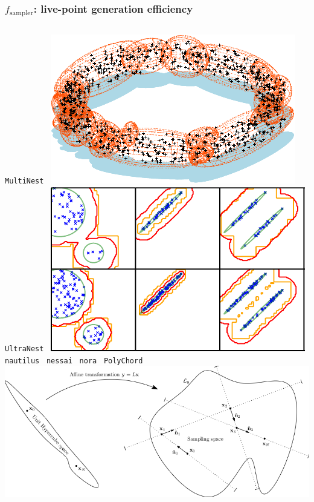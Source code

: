 \documentclass[aspectratio=169]{beamer}
\begin{document}
\begin{frame}
    \frametitle{$f_\text{sampler}$: live-point generation efficiency}
    \begin{columns}[t]
        \texttt{MultiNest}~
        \includegraphics[width=\textwidth]{figures/multinest}
        \texttt{UltraNest}~
        \includegraphics[width=\textwidth]{figures/radfriends}
        \texttt{nautilus}~ 
        \texttt{nessai}~
        \texttt{nora}~
        \texttt{PolyChord}~
        \includegraphics[width=\textwidth]{figures/polychord}

\end{columns}
\end{frame}
\end{document}
